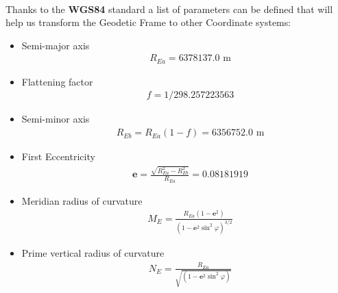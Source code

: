 \paragraph{}Thanks to the \textbf{WGS84} standard a list of parameters can be defined that will help us transform the Geodetic Frame to other Coordinate systems:

\begin{itemize}
\item{Semi-major axis\\
\begin{align*}
& R_{Ea} = 6378137.0 \text{ m}
\end{align*}}
\item{Flattening factor\\
\begin{align*}
& f = 1/298.257223563 
\end{align*}}
\item{Semi-minor axis \\
\begin{align*}
& R_{Eb} = R_{Ea}(1-f) = 6356752.0 \text{ m}
\end{align*}}
\item{First Eccentricity \\
\begin{align*}
& \textbf{e} = \frac{\sqrt{R_{Ea}^2-R_{Eb}^2}}{R_{Ea}} = 0.08181919
\end{align*}}
\item{Meridian radius of curvature \\
\begin{align*}
& M_{E} = \frac{R_{Ea}(1-\textbf{e}^2)}{(1-\textbf{e}^2\sin^2\varphi)^{3/2}} 
\end{align*}}
\item{Prime vertical radius of curvature \\
\begin{align*}
& N_{E} = \frac{R_{Ea}}{\sqrt{(1-\textbf{e}^2\sin^2\varphi)}}
\end{align*}}
\end{itemize}

